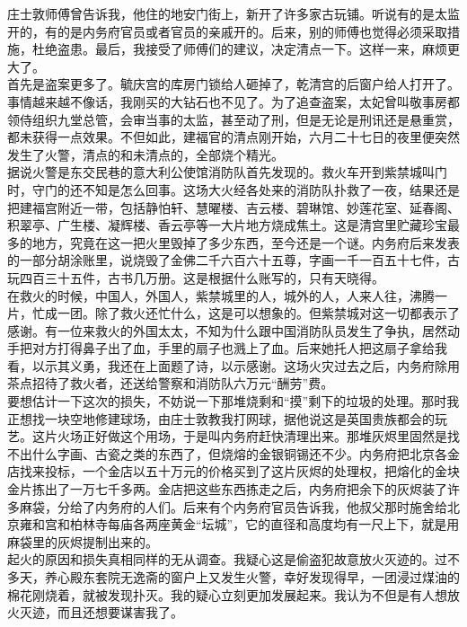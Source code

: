 庄士敦师傅曾告诉我，他住的地安门街上，新开了许多家古玩铺。听说有的是太监开的，有的是内务府官员或者官员的亲戚开的。后来，别的师傅也觉得必须采取措施，杜绝盗患。最后，我接受了师傅们的建议，决定清点一下。这样一来，麻烦更大了。\\

首先是盗案更多了。毓庆宫的库房门锁给人砸掉了，乾清宫的后窗户给人打开了。事情越来越不像话，我刚买的大钻石也不见了。为了追查盗案，太妃曾叫敬事房都领侍组织九堂总管，会审当事的太监，甚至动了刑，但是无论是刑讯还是悬重赏，都未获得一点效果。不但如此，建福官的清点刚开始，六月二十七日的夜里便突然发生了火警，清点的和未清点的，全部烧个精光。\\

据说火警是东交民巷的意大利公使馆消防队首先发现的。救火车开到紫禁城叫门时，守门的还不知是怎么回事。这场大火经各处来的消防队扑救了一夜，结果还是把建福宫附近一带，包括静怕轩、慧曜楼、吉云楼、碧琳馆、妙莲花室、延春阁、积翠亭、广生楼、凝辉楼、香云亭等一大片地方烧成焦土。这是清宫里贮藏珍宝最多的地方，究竟在这一把火里毁掉了多少东西，至今还是一个谜。内务府后来发表的一部分胡涂账里，说烧毁了金佛二千六百六十五尊，字画一千一百五十七件，古玩四百三十五件，古书几万册。这是根据什么账写的，只有天晓得。\\

在救火的时候，中国人，外国人，紫禁城里的人，城外的人，人来人往，沸腾一片，忙成一团。除了救火还忙什么，这是可以想象的。但紫禁城对这一切都表示了感谢。有一位来救火的外国太太，不知为什么跟中国消防队员发生了争执，居然动手把对方打得鼻子出了血，手里的扇子也溅上了血。后来她托人把这扇子拿给我看，以示其义勇，我还在上面题了诗，以示感谢。这场火灾过去之后，内务府除用茶点招待了救火者，还送给警察和消防队六万元“酬劳”费。\\

要想估计一下这次的损失，不妨说一下那堆烧剩和“摸”剩下的垃圾的处理。那时我正想找一块空地修建球场，由庄士敦教我打网球，据他说这是英国贵族都会的玩艺。这片火场正好做这个用场，于是叫内务府赶快清理出来。那堆灰烬里固然是找不出什么字画、古瓷之类的东西了，但烧熔的金银铜锡还不少。内务府把北京各金店找来投标，一个金店以五十万元的价格买到了这片灰烬的处理权，把熔化的金块金片拣出了一万七千多两。金店把这些东西拣走之后，内务府把余下的灰烬装了许多麻袋，分给了内务府的人们。后来有个内务府官员告诉我，他叔父那时施舍给北京雍和宫和柏林寺每庙各两座黄金“坛城”，它的直径和高度均有一尺上下，就是用麻袋里的灰烬提制出来的。\\

起火的原因和损失真相同样的无从调查。我疑心这是偷盗犯故意放火灭迹的。过不多天，养心殿东套院无逸斋的窗户上又发生火警，幸好发现得早，一团浸过煤油的棉花刚烧着，就被发现扑灭。我的疑心立刻更加发展起来。我认为不但是有人想放火灭迹，而且还想要谋害我了。\\


